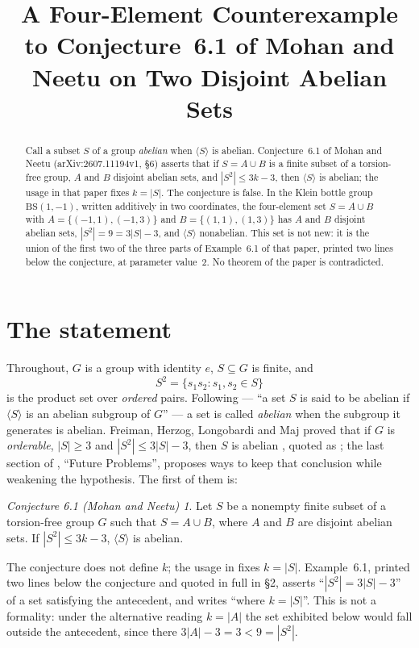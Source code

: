 \documentclass[11pt]{amsart}
\title[A counterexample to a two-abelian-set conjecture]
{A Four-Element Counterexample to Conjecture~6.1 of Mohan and Neetu
 on Two Disjoint Abelian Sets}
\date{}
\theoremstyle{remark}
\newtheorem*{conjA}{Conjecture 6.1 (Mohan and Neetu)}
\begin{document}
\begin{abstract}
Call a subset $S$ of a group \emph{abelian} when $\langle S\rangle$ is abelian.
Conjecture~6.1 of Mohan and Neetu (arXiv:2607.11194v1, \S6) asserts that if
$S=A\cup B$ is a finite subset of a torsion-free group, $A$ and $B$ disjoint
abelian sets, and $|S^{2}|\le3k-3$, then $\langle S\rangle$ is abelian; the
usage in that paper fixes $k=|S|$. The conjecture is false. In the Klein bottle
group $\mathrm{BS}(1,-1)$, written additively in two coordinates, the
four-element set $S=A\cup B$ with $A=\{(-1,1),(-1,3)\}$ and
$B=\{(1,1),(1,3)\}$ has $A$ and $B$ disjoint abelian sets, $|S^{2}|=9=3|S|-3$,
and $\langle S\rangle$ nonabelian. This set is not new: it is the union of the
first two of the three parts of Example~6.1 of that paper, printed two lines
below the conjecture, at parameter value~$2$. No theorem of the paper is
contradicted.
\end{abstract}

\maketitle

\section{The statement}

Throughout, $G$ is a group with identity $e$, $S\subseteq G$ is finite, and
\[
  S^{2}=\{s_{1}s_{2}:s_{1},s_{2}\in S\}
\]
is the product set over \emph{ordered} pairs. Following \cite[\S1]{MN} ---
``a set $S$ is said to be abelian if $\langle S\rangle$ is an abelian subgroup
of $G$'' --- a set is called \emph{abelian} when the subgroup it generates is
abelian. Freiman, Herzog, Longobardi and Maj proved that if $G$ is
\emph{orderable}, $|S|\ge3$ and $|S^{2}|\le3|S|-3$, then $S$ is abelian
\cite[Theorem~1.3]{FHLM}, quoted as \cite[Theorem~2.3]{MN}; the last section of
\cite{MN}, ``Future Problems'', proposes ways to keep that conclusion while
weakening the hypothesis. The first of them is:

\begin{conjA}
Let $S$ be a nonempty finite subset of a torsion-free group $G$ such that
$S=A\cup B$, where $A$ and $B$ are disjoint abelian sets. If
$|S^{2}|\le 3k-3$, $\langle S\rangle$ is abelian.
\end{conjA}

\noindent
The conjecture does not define $k$; the usage in \cite{MN} fixes $k=|S|$.
Example~6.1, printed two lines below the conjecture and quoted in full in \S2,
asserts ``$|S^{2}|=3|S|-3$'' of a set satisfying the antecedent, and
\cite[Theorem~2.9]{MN} writes ``where $k=|S|$''. This is not a formality: under
the alternative reading $k=|A|$ the set exhibited below would fall outside the
antecedent, since there $3|A|-3=3<9=|S^{2}|$.
\end{document}
